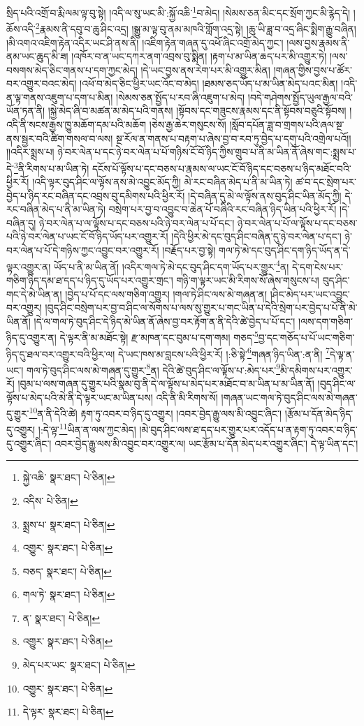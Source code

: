 སྲིད་པའི་འགྲོ་བ་རྨི་ལམ་ལྟ་བུ་སྟེ། །འདི་ལ་སུ་ཡང་མི་:སྐྱོ་འཆི་\footnote{སྐྱེ་འཆི་  སྣར་ཐང་།  པེ་ཅིན། }བ་མེད། །སེམས་ཅན་མིང་དང་སྲོག་ཀྱང་མི་རྙེད་དེ། །ཆོས་འདི་\footnote{འདིས་  པེ་ཅིན། }རྣམས་ནི་དབུ་བ་ཆུ་ཤིང་འདྲ། །སྒྱུ་མ་ལྟ་བུ་ནམ་མཁའི་གློག་འདྲ་སྟེ། །ཆུ་ཡི་ཟླ་བ་འདྲ་ཞིང་སྨིག་རྒྱུ་བཞིན། །མི་འགའ་འཇིག་རྟེན་འདིར་ཡང་ཤི་ནས་ནི། །འཇིག་རྟེན་གཞན་དུ་འཕོ་ཞིང་འགྲོ་མེད་ཀྱང་། །ལས་བྱས་རྣམས་ནི་ནམ་ཡང་ཆུད་མི་ཟ། །འཁོར་བ་ན་ཡང་དཀར་ནག་འབྲས་བུ་སྨིན། །རྟག་པ་མ་ཡིན་ཆད་པར་མི་འགྱུར་ཏེ། །ལས་བསགས་མེད་ཅིང་གནས་པ་དག་ཀྱང་མེད། །དེ་ཡང་བྱས་ནས་རེག་པར་མི་འགྱུར་མིན། །གཞན་གྱིས་བྱས་པ་ཚོར་བར་འགྱུར་བའང་མེད། །འཕོ་བ་མེད་ཅིང་ཕྱིར་ཡང་འོང་བ་མེད། །ཐམས་ཅད་ཡོད་པ་མ་ཡིན་མེད་པའང་མིན། །འདི་ན་ལྟ་གནས་འཇུག་པ་དག་པ་མིན། །སེམས་ཅན་སྤྱོད་པ་རབ་ཞི་འཇུག་པ་མེད། །བདེ་གཤེགས་སྤྱོད་ཡུལ་རྒྱལ་བའི་ཡོན་ཏན་ནི། །སྐྱེ་མེད་ཞི་བ་མཚན་མ་མེད་པའི་གནས། །སྟོབས་དང་གཟུངས་རྣམས་དང་ནི་སྟོབས་བཅུའི་སྟོབས། །འདི་ནི་སངས་རྒྱས་ཁྱུ་མཆོག་དམ་པའི་མཆོག །ཅེས་རྒྱ་ཆེར་གསུངས་སོ། །སློབ་དཔོན་ཟླ་བ་གྲགས་པའི་ཞལ་སྔ་ནས་སྦྱར་བའི་ཚིག་གསལ་བ་ལས། སྔ་རོལ་ན་གནས་པ་བརྟག་པ་ཞེས་བྱ་བ་རབ་ཏུ་བྱེད་པ་དགུ་པའི་འགྲེལ་པའོ།། །།འདིར་སྨྲས་པ། ཉེ་བར་ལེན་པ་དང་ཉེ་བར་ལེན་པ་པོ་གཉིས་ངོ་བོ་ཉིད་ཀྱིས་གྲུབ་པ་ནི་མ་ཡིན་ནོ་ཞེས་གང་:སྨྲས་པ་དེ་\footnote{སྨྲས་པ་  སྣར་ཐང་།  པེ་ཅིན། }ནི་རིགས་པ་མ་ཡིན་ཏེ། དངོས་པོ་ལྟོས་པ་དང་བཅས་པ་རྣམས་ལ་ཡང་ངོ་བོ་ཉིད་དང་བཅས་པ་ཉིད་མཐོང་བའི་ཕྱིར་རོ། །འདི་ལྟར་བུད་ཤིང་ལ་ལྟོས་ནས་མེ་འབྱུང་མོད་ཀྱི། མེ་རང་བཞིན་མེད་པ་ནི་མ་ཡིན་ཏེ། ཚ་བ་དང་སྲེག་པར་བྱེད་པ་ཉིད་རང་བཞིན་དང་འབྲས་བུ་དམིགས་པའི་ཕྱིར་རོ། །དེ་བཞིན་དུ་མེ་ལ་ལྟོས་ནས་བུད་ཤིང་ཡིན་མོད་ཀྱི། དེ་རང་བཞིན་མེད་པ་ནི་མ་ཡིན་ཏེ། བསྲེག་པར་བྱ་བ་འབྱུང་བ་ཆེན་པོ་བཞིའི་རང་བཞིན་ཉིད་ཡིན་པའི་ཕྱིར་རོ། །དེ་བཞིན་དུ། ཉེ་བར་ལེན་པ་ལ་ལྟོས་པ་དང་བཅས་པའི་ཉེ་བར་ལེན་པ་པོ་དང་། ཉེ་བར་ལེན་པ་པོ་ལ་ལྟོས་པ་དང་བཅས་པའི་ཉེ་བར་ལེན་པ་ཡང་ངོ་བོ་ཉིད་ཡོད་པར་འགྱུར་རོ། །དེའི་ཕྱིར་མེ་དང་བུད་ཤིང་བཞིན་དུ་ཉེ་བར་ལེན་པ་དང་། ཉེ་བར་ལེན་པ་པོ་དེ་གཉིས་ཀྱང་འབྱུང་བར་འགྱུར་རོ། །བརྗོད་པར་བྱ་སྟེ། གལ་ཏེ་མེ་དང་བུད་ཤིང་དག་ཉིད་ཡོད་ན་དེ་ལྟར་འགྱུར་ན། ཡོད་པ་ནི་མ་ཡིན་ནོ། །འདིར་གལ་ཏེ་མེ་དང་བུད་ཤིང་དག་ཡོད་པར་གྱུར་\footnote{འགྱུར་  སྣར་ཐང་།  པེ་ཅིན། }ན། དེ་དག་ངེས་པར་གཅིག་ཉིད་དམ་ཐ་དད་པ་ཉིད་དུ་ཡོད་པར་འགྱུར་གྲང་། གཉི་ག་ལྟར་ཡང་མི་རིགས་སོ་ཞེས་གསུངས་པ། བུད་ཤིང་གང་དེ་མེ་ཡིན་ན། །བྱེད་པ་པོ་དང་ལས་གཅིག་འགྱུར། །གལ་ཏེ་ཤིང་ལས་མེ་གཞན་ན། །ཤིང་མེད་པར་ཡང་འབྱུང་བར་འགྱུར། །བུད་ཤིང་བསྲེག་པར་བྱ་བ་ཤིང་ལ་སོགས་པ་ལས་སུ་གྱུར་པ་གང་ཡིན་པ་དེའི་སྲེག་པར་བྱེད་པ་པོ་ནི་མེ་ཡིན་ནོ། །དེ་ལ་གལ་ཏེ་བུད་ཤིང་དེ་ཉིད་མེ་ཡིན་ནོ་ཞེས་བྱ་བར་རྟོག་ན་ནི་དེའི་ཚེ་བྱེད་པ་པོ་དང་། །ལས་དག་གཅིག་ཉིད་དུ་འགྱུར་ན། དེ་ལྟར་ནི་མ་མཐོང་སྟེ། རྫ་མཁན་དང་བུམ་པ་དག་གམ། གཅད་\footnote{བཅད་  སྣར་ཐང་།  པེ་ཅིན། }བྱ་དང་གཅོད་པ་པོ་ཡང་གཅིག་ཉིད་དུ་ཐལ་བར་འགྱུར་བའི་ཕྱིར་ལ། དེ་ཡང་ཁས་མ་བླངས་པའི་ཕྱིར་རོ། །:ཅི་སྟེ་\footnote{གལ་ཏེ་  སྣར་ཐང་།  པེ་ཅིན། }གཞན་ཉིད་ཡིན་:ན་ནི། \footnote{ན་  སྣར་ཐང་།  པེ་ཅིན། }དེ་ལྟ་ན་ཡང་། གལ་ཏེ་བུད་ཤིང་ལས་མེ་གཞན་དུ་གྱུར་\footnote{འགྱུར་  སྣར་ཐང་།  པེ་ཅིན། }ན། དེའི་ཚེ་བུད་ཤིང་ལ་ལྟོས་པ་:མེད་པར་\footnote{མེད་པར་ཡང་  སྣར་ཐང་།  པེ་ཅིན། }མི་དམིགས་པར་འགྱུར་རོ། །བུམ་པ་ལས་གཞན་དུ་གྱུར་པའི་སྣམ་བུ་ནི་དེ་ལ་ལྟོས་པ་མེད་པར་མཐོང་བ་མ་ཡིན་པ་མ་ཡིན་ནོ། །བུད་ཤིང་ལ་ལྟོས་པ་མེད་པའི་མེ་ནི་དེ་ལྟར་ཡང་མ་ཡིན་པས། འདི་ནི་མི་རིགས་སོ། །གཞན་ཡང་གལ་ཏེ་བུད་ཤིང་ལས་མེ་གཞན་དུ་གྱུར་\footnote{འགྱུར་  སྣར་ཐང་།  པེ་ཅིན། }ན་ནི་དེའི་ཚེ། རྟག་ཏུ་འབར་བ་ཉིད་དུ་འགྱུར། །འབར་བྱེད་རྒྱུ་ལས་མི་འབྱུང་ཞིང་། །རྩོམ་པ་དོན་མེད་ཉིད་དུ་འགྱུར། །:དེ་ལྟ་\footnote{དེ་ལྟར་  སྣར་ཐང་།  པེ་ཅིན། }ཡིན་ན་ལས་ཀྱང་མེད། །མེ་བུད་ཤིང་ལས་ཐ་དད་པར་གྱུར་པར་འདོད་པ་ན་རྟག་ཏུ་འབར་བ་ཉིད་དུ་འགྱུར་ཞིང་། འབར་བྱེད་རྒྱུ་ལས་མི་འབྱུང་བར་འགྱུར་ལ། ཡང་རྩོམ་པ་དོན་མེད་པར་འགྱུར་ཞིང་། དེ་ལྟ་ཡིན་དང་། 
